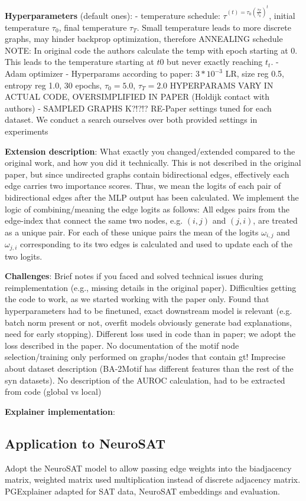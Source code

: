 \textbf{Hyperparameters} (default ones):
- temperature schedule: $\tau^{(t) = \tau_0(\frac{\tau_T}{\tau_0})^t}$, initial temperature $\tau_0$, final temperature $\tau_T$. Small temperature leads to more discrete graphs, may hinder backprop optimization, therefore ANNEALING schedule
NOTE: In original code the authors calculate the temp with epoch starting at 0. This leads to the temperature starting at $t0$ but never exactly reaching $t_t$.
- Adam optimizer
- Hyperparams according to paper: $3*10^{-3}$ LR, size reg 0.5, entropy reg 1.0, 30 epochs, $\tau_0 = 5.0$, $\tau_T = 2.0$ HYPERPARAMS VARY IN ACTUAL CODE, OVERSIMPLIFIED IN PAPER (Holdijk contact with authors)
- SAMPLED GRAPHS K?!?!?
RE-Paper settings tuned for each dataset. We conduct a search ourselves over both provided settings in experiments

\textbf{Extension description}: What exactly you changed/extended compared to the original work, and how you did it technically.
This is not described in the original paper, but since undirected graphs contain bidirectional edges, effectively each edge carries two importance scores. Thus, we mean the logits of each pair of bidirectional edges after the MLP output has been calculated. We implement the logic of combining/meaning the edge logits as follows: All edges pairs from the edge-index that connect the same two nodes, e.g. $(i,j)$ and $(j,i)$, are treated as a unique pair. For each of these unique pairs the mean of the logits $\omega_{i,j}$ and $\omega_{j,i}$ corresponding to its two edges is calculated and used to update each of the two logits.

\textbf{Challenges}: Brief notes if you faced and solved technical issues during reimplementation (e.g., missing details in the original paper). Difficulties getting the code to work, as we started working with the paper only. Found that hyperparameters had to be finetuned, exact downstream model is relevant (e.g. batch norm present or not, overfit models obviously generate bad explanations, need for early stopping). Different loss used in code than in paper; we adopt the loss described in the paper. No documentation of the motif node selection/training only performed on graphs/nodes that contain gt! Imprecise about dataset description (BA-2Motif has different features than the rest of the syn datasets). No description of the AUROC calculation, had to be extracted from code (global vs local)

\textbf{Explainer implementation}:

\subsection{Application to NeuroSAT}
\label{sec:Application_to_NeuroSAT}
Adopt the NeuroSAT model to allow passing edge weights into the biadjacency matrix, weighted matrix used multiplication instead of discrete adjacency matrix. PGExplainer adapted for SAT data, NeuroSAT embeddings and evaluation.



